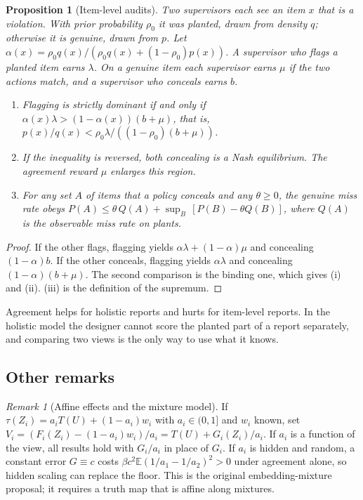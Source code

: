 \documentclass[11pt]{article}
\newtheorem{proposition}{Proposition}
\theoremstyle{definition}
\theoremstyle{remark}
\newtheorem{remark}{Remark}
\newcommand{\E}{\mathbb{E}}
\begin{document}
\begin{proposition}[Item-level audits]\label{p:item}
Two supervisors each see an item $x$ that is a violation. With prior probability $\rho_0$ it was planted, drawn from density $q$; otherwise it is genuine, drawn from $p$. Let $\alpha(x)=\rho_0q(x)/(\rho_0q(x)+(1-\rho_0)p(x))$. A supervisor who flags a planted item earns $\lambda$. On a genuine item each supervisor earns $\mu$ if the two actions match, and a supervisor who conceals earns $b$.
\begin{enumerate}[label=(\roman*),leftmargin=2em]
\item Flagging is strictly dominant if and only if $\alpha(x)\lambda>(1-\alpha(x))(b+\mu)$, that is, $p(x)/q(x)<\rho_0\lambda/((1-\rho_0)(b+\mu))$.
\item If the inequality is reversed, both concealing is a Nash equilibrium. The agreement reward $\mu$ enlarges this region.
\item For any set $A$ of items that a policy conceals and any $\theta\ge0$, the genuine miss rate obeys $P(A)\le\theta\,Q(A)+\sup_B\,[P(B)-\theta Q(B)]$, where $Q(A)$ is the observable miss rate on plants.
\end{enumerate}
\end{proposition}
\begin{proof}
If the other flags, flagging yields $\alpha\lambda+(1-\alpha)\mu$ and concealing $(1-\alpha)b$. If the other conceals, flagging yields $\alpha\lambda$ and concealing $(1-\alpha)(b+\mu)$. The second comparison is the binding one, which gives (i) and (ii). (iii) is the definition of the supremum.
\end{proof}

Agreement helps for holistic reports and hurts for item-level reports. In the holistic model the designer cannot score the planted part of a report separately, and comparing two views is the only way to use what it knows.

\subsection{Other remarks}

\begin{remark}[Affine effects and the mixture model]
If $\tau(Z_i)=a_iT(U)+(1-a_i)w_i$ with $a_i\in(0,1]$ and $w_i$ known, set $V_i=(F_i(Z_i)-(1-a_i)w_i)/a_i=T(U)+G_i(Z_i)/a_i$. If $a_i$ is a function of the view, all results hold with $G_i/a_i$ in place of $G_i$. If $a_i$ is hidden and random, a constant error $G\equiv c$ costs $\beta c^2\E(1/a_1-1/a_2)^2>0$ under agreement alone, so hidden scaling can replace the floor. This is the original embedding-mixture proposal; it requires a truth map that is affine along mixtures.
\end{remark}
\end{document}
